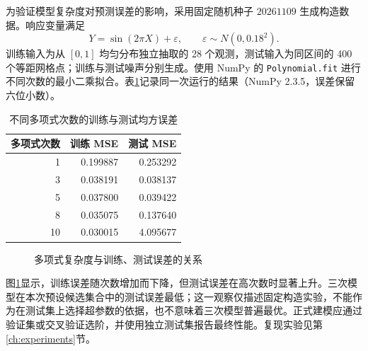 为验证模型复杂度对预测误差的影响，采用固定随机种子 $20261109$ 生成构造数据。响应变量满足
\begin{equation}\label{eq:poly-data}
Y=\sin(2\pi X)+\varepsilon,\qquad \varepsilon\sim N(0,0.18^2).
\end{equation}
训练输入为从 $[0,1]$ 均匀分布独立抽取的 28 个观测，测试输入为同区间的 400 个等距网格点；训练与测试噪声分别生成。使用 NumPy 的 \texttt{Polynomial.fit} 进行不同次数的最小二乘拟合。表\ref{tab:polynomial-compare}记录同一次运行的结果（NumPy 2.3.5，误差保留六位小数）。
\begin{table}[htbp]\centering
\caption{不同多项式次数的训练与测试均方误差}\label{tab:polynomial-compare}
\begin{tabular}{rrr}\toprule
多项式次数 & 训练 MSE & 测试 MSE\\\midrule
1 & 0.199887 & 0.253292\\
3 & 0.038191 & 0.038137\\
5 & 0.037800 & 0.039422\\
8 & 0.035075 & 0.137640\\
10 & 0.030015 & 4.095677\\\bottomrule
\end{tabular}
\end{table}
\begin{figure}[htbp]\centering
{}
\caption{多项式复杂度与训练、测试误差的关系}\label{fig:poly-comparison}
\end{figure}
图\ref{fig:poly-comparison}显示，训练误差随次数增加而下降，但测试误差在高次数时显著上升。三次模型在本次预设候选集合中的测试误差最低；这一观察仅描述固定构造实验，不能作为在测试集上选择超参数的依据，也不意味着三次模型普遍最优。正式建模应通过验证集或交叉验证选阶，并使用独立测试集报告最终性能。复现实验见第\ref{ch:experiments}节。
